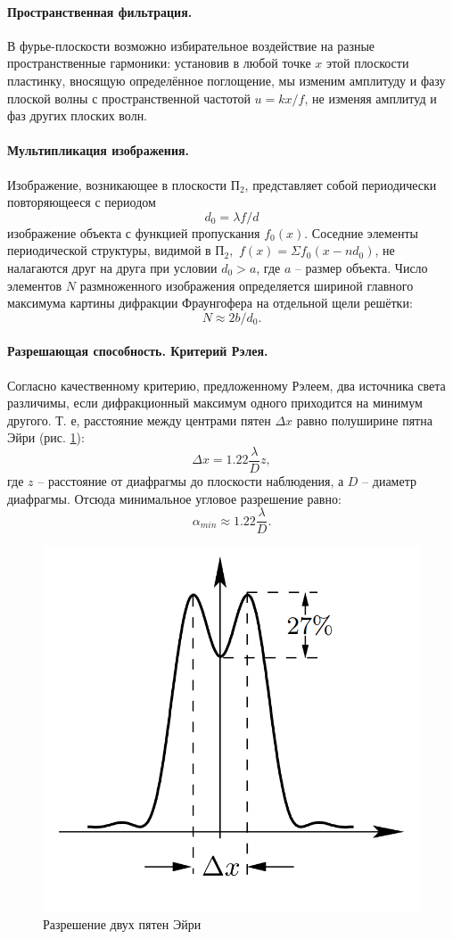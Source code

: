 \documentclass[a4paper, 12pt]{article}%
\begin{document}
	\paragraph{Пространственная фильтрация.}
	
	В фурье-плоскости возможно избирательное воздействие на разные пространственные гармоники: установив в любой точке $ x $ этой плоскости пластинку, вносящую определённое поглощение, мы изменим амплитуду и фазу плоской волны с пространственной частотой $ u = k x / f $, не изменяя амплитуд и фаз других плоских волн.
	
	\paragraph{Мультипликация изображения.}
	
	Изображение, возникающее в плоскости $ П_2 $, представляет собой периодически повторяющееся с периодом $$ d_0 = \lambda f / d $$ изображение объекта с функцией пропускания $ f_0 (x) $.
	Соседние элементы периодической структуры, видимой в $ П_2, $ $ f(x) = \Sigma f_0(x-n d_0) $, не налагаются друг на друга при условии $ d_0 > a $, где $ a $ -- размер объекта. Число элементов $ N $ размноженного изображения определяется шириной главного максимума картины дифракции Фраунгофера на отдельной щели решётки: $$ N\approx 2 b / d_0. $$
	
	\paragraph{Разрешающая способность. Критерий Рэлея.} 
	
	Согласно качественному критерию, предложенному Рэлеем, два источника света различимы, если дифракционный максимум одного приходится на минимум другого. Т. е, расстояние между центрами пятен $ \Delta x $ равно полуширине пятна Эйри (рис. \ref{fig:screenshot2}): \[\Delta x = 1.22 \frac{\lambda}{D} z,\] где $ z $ -- расстояние от диафрагмы до плоскости наблюдения, а $ D $ -- диаметр диафрагмы. Отсюда минимальное угловое разрешение равно: \[\alpha_{min} \approx 1.22 \frac{\lambda}{D}.\]
	
	\begin{figure}[H]
		\centering
		\includegraphics[width=0.5\linewidth]{Screenshot_2}
		\caption{Разрешение двух пятен Эйри}
		\label{fig:screenshot2}
	\end{figure}
	
\end{document}
